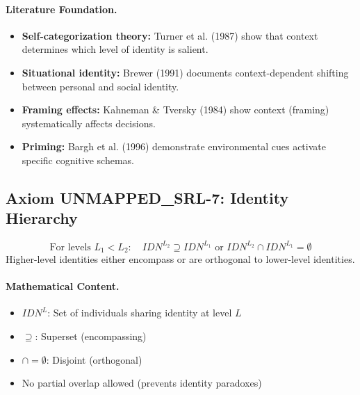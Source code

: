 \paragraph{Literature Foundation.}
\begin{itemize}
\item \textbf{Self-categorization theory:} Turner et al. (1987) show that context 
determines which level of identity is salient.
\item \textbf{Situational identity:} Brewer (1991) documents context-dependent 
shifting between personal and social identity.
\item \textbf{Framing effects:} Kahneman \& Tversky (1984) show context 
(framing) systematically affects decisions.
\item \textbf{Priming:} Bargh et al. (1996) demonstrate environmental cues 
activate specific cognitive schemas.
\end{itemize}

\subsection{Axiom UNMAPPED_SRL-7: Identity Hierarchy}

\begin{tcolorbox}[colback=gray!5!white, colframe=gray!75!black, title=Axiom UNMAPPED_SRL-7: Identity Hierarchy]
\begin{equation}
\boxed{
\text{For levels } L_1 < L_2: \quad IDN^{L_2} \supseteq IDN^{L_1} \text{ or } IDN^{L_2} \cap IDN^{L_1} = \emptyset
}
\end{equation}
Higher-level identities either encompass or are orthogonal to lower-level identities.
\end{tcolorbox}

\paragraph{Mathematical Content.}
\begin{itemize}
\item $IDN^L$: Set of individuals sharing identity at level $L$
\item $\supseteq$: Superset (encompassing)
\item $\cap = \emptyset$: Disjoint (orthogonal)
\item No partial overlap allowed (prevents identity paradoxes)
\end{itemize}

